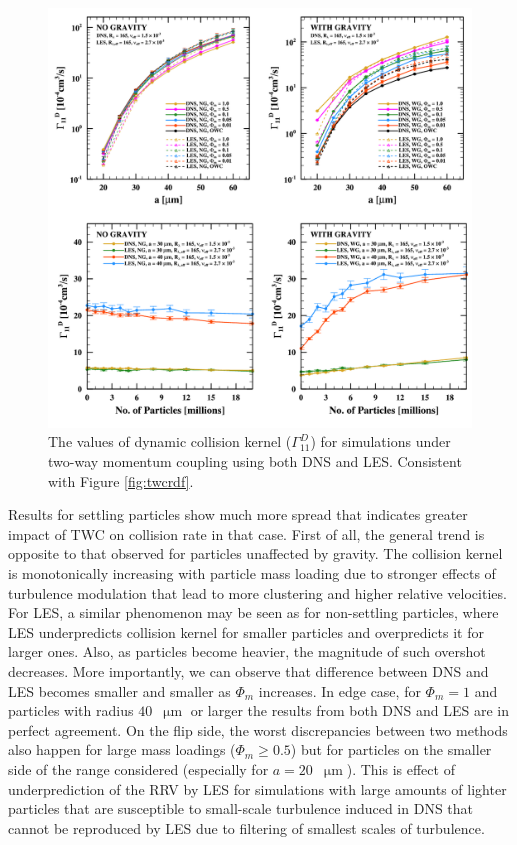 \documentclass{pracamgren}
\begin{document}
\begin{figure}[ht]
\centering
\includegraphics[width=13.5cm]{figures/2-12_twcgamma.pdf}
\caption{
The values of dynamic collision kernel ($\Gamma_{11}^D$) for simulations under two-way momentum coupling using both DNS and LES.
Consistent with Figure \ref{fig:twcrdf}.
}
\label{fig:twcgamma}
\end{figure}

Results for settling particles show much more spread that indicates greater impact of TWC on collision rate in that case.
First of all, the general trend is opposite to that observed for particles unaffected by gravity.
The collision kernel is monotonically increasing with particle mass loading due to stronger effects of turbulence modulation that lead to more clustering and higher relative velocities.
For LES, a similar phenomenon may be seen as for non-settling particles, where LES underpredicts collision kernel for smaller particles and overpredicts it for larger ones.
Also, as particles become heavier, the magnitude of such overshot decreases.
More importantly, we can observe that difference between DNS and LES becomes smaller and smaller as $\Phi_m$ increases.
In edge case, for $\Phi_m = 1$ and particles with radius $40$~$\upmu\text{m}$ or larger the results from both DNS and LES are in perfect agreement.
On the flip side, the worst discrepancies between two methods also happen for large mass loadings ($\Phi_m \ge 0.5$) but for particles on the smaller side of the range considered (especially for ${a = 20}$~$\upmu\text{m}$).
This is effect of underprediction of the RRV by LES for simulations with large amounts of lighter particles that are susceptible to small-scale turbulence induced in DNS that cannot be reproduced by LES due to filtering of smallest scales of turbulence.
\end{document}
